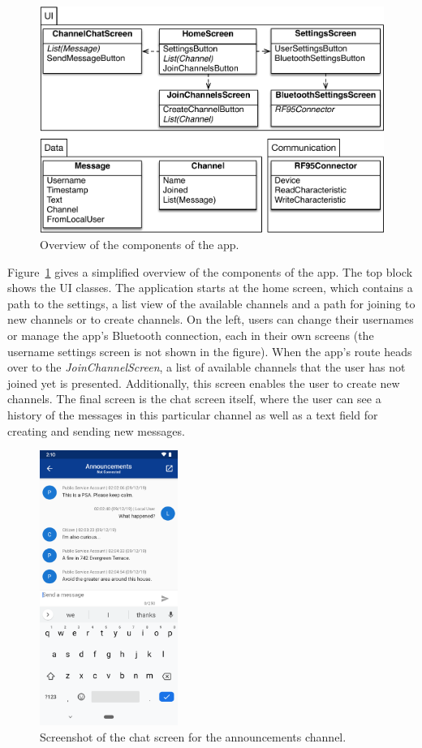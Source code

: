 \begin{figure}[ht!]
    \centering
    \includegraphics[width=.8\columnwidth]{gfx/bluera-uml.pdf}
    \caption{Overview of the components of the app.}
    \label{hoechst2020lora:fig:app_uml}
\end{figure}

Figure~\ref{hoechst2020lora:fig:app_uml} gives a simplified overview of the components of the app.
The top block shows the UI classes.
The application starts at the home screen, which contains a path to the settings, a list view of the available channels and a path for joining to new channels or to create channels.
On the left, users can change their usernames or manage the app's Bluetooth connection, each in their own screens (the username settings screen is not shown in the figure).
When the app's route heads over to the \emph{JoinChannelScreen}, a list of available channels that the user has not joined yet is presented.
Additionally, this screen enables the user to create new channels.
The final screen is the chat screen itself, where the user can see a history of the messages in this particular channel as well as a text field for creating and sending new messages.

\begin{figure}[ht!]
    \centering
    \includegraphics[width=0.4\textwidth]{gfx/bluera-screenshot.png}
    \caption{Screenshot of the chat screen for the announcements channel.}
    \label{hoechst2020lora:fig:app_screenshot}
\end{figure}

